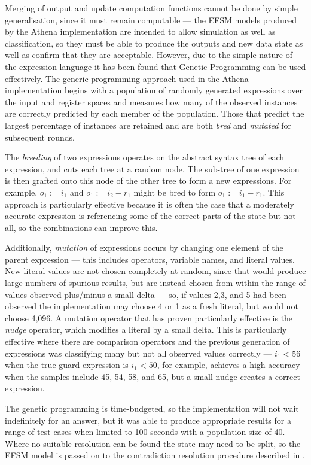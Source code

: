 Merging of output and update computation functions cannot be done by simple generalisation, since it must remain computable --- the EFSM models produced by the Athena implementation are intended to allow simulation as well as classification, so they must be able to produce the outputs and new data state as well as confirm that they are acceptable. However, due to the simple nature of the expression language it has been found that Genetic Programming \cite{} can be used effectively. The generic programming approach used in the Athena implementation begins with a population of randomly generated expressions over the input and register spaces and measures how many of the observed instances are correctly predicted by each member of the population. Those that predict the largest percentage of instances are retained and are both \emph{bred} and \emph{mutated} for subsequent rounds. 

The \emph{breeding} of two expressions operates on the abstract syntax tree of each expression, and cuts each tree at a random node. The sub-tree of one expression is then grafted onto this node of the other tree to form a new expressions. For example, $o_1 := i_1$ and $o_1 := i_2 - r_1$ might be bred to form $o_1 := i_1 - r_1$. This approach is particularly effective because it is often the case that a moderately accurate expression is referencing some of the correct parts of the state but not all, so the combinations can improve this.

Additionally, \emph{mutation} of expressions occurs by changing one element of the parent expression --- this includes operators, variable names, and literal values. New literal values are not chosen completely at random, since that would produce large numbers of spurious results, but are instead chosen from within the range of values observed plus/minus a small delta --- so, if values 2,3, and 5 had been observed the implementation may choose 4 or 1 as a fresh literal, but would not choose 4,096. A mutation operator that has proven particularly effective is the \emph{nudge} operator, which modifies a literal by a small delta. This is particularly effective where there are comparison operators and the previous generation of expressions was classifying many but not all observed values correctly --- $i_1 < 56$ when the true guard expression is $i_1 < 50$, for example, achieves a high accuracy when the samples include 45, 54, 58, and 65, but a small nudge creates a correct expression.

The genetic programming is time-budgeted, so the implementation will not wait indefinitely for an answer, but it was able to produce appropriate results for a range of test cases when limited to 100 seconds with a population size of 40. Where no suitable resolution can be found the state may need to be split, so the EFSM model is passed on to the contradiction resolution procedure described in .

